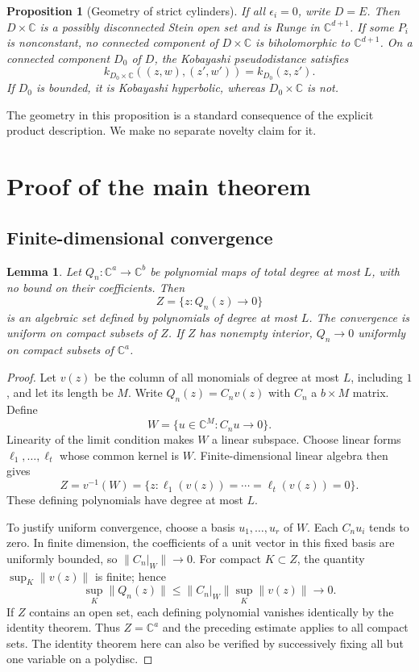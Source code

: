 \documentclass[12pt]{amsart}
\newtheorem{prop}[thm]{Proposition}
\newtheorem{lem}[thm]{Lemma}
\theoremstyle{definition}
\theoremstyle{remark}
\numberwithin{equation}{section}
\newcommand{\C}{\mathbb{C}}
\begin{document}
\begin{prop}[Geometry of strict cylinders]\label{prop:geometry-en}
If all $\epsilon_i=0$, write $D=E$. Then $D\times\C$ is a possibly disconnected Stein open set and is Runge in $\C^{d+1}$. If some $P_i$ is nonconstant, no connected component of $D\times\C$ is biholomorphic to $\C^{d+1}$. On a connected component $D_0$ of $D$, the Kobayashi pseudodistance satisfies
\begin{equation}\label{eq:kobayashi-en}
k_{D_0\times\C}((z,w),(z',w'))=k_{D_0}(z,z').
\end{equation}
If $D_0$ is bounded, it is Kobayashi hyperbolic, whereas $D_0\times\C$ is not.
\end{prop}
The geometry in this proposition is a standard consequence of the explicit product description. We make no separate novelty claim for it.

\section{Proof of the main theorem}
\subsection{Finite-dimensional convergence}
\begin{lem}\label{lem:finite-en}
Let $Q_n:\C^a\to\C^b$ be polynomial maps of total degree at most $L$, with no bound on their coefficients. Then
\[
Z=\{z:Q_n(z)\to0\}
\]
is an algebraic set defined by polynomials of degree at most $L$. The convergence is uniform on compact subsets of $Z$. If $Z$ has nonempty interior, $Q_n\to0$ uniformly on compact subsets of $\C^a$.
\end{lem}
\begin{proof}
Let $v(z)$ be the column of all monomials of degree at most $L$, including $1$, and let its length be $M$. Write $Q_n(z)=C_n v(z)$ with $C_n$ a $b\times M$ matrix. Define
\[
W=\{u\in\C^M:C_nu\to0\}.
\]
Linearity of the limit condition makes $W$ a linear subspace. Choose linear forms $\ell_1,\ldots,\ell_t$ whose common kernel is $W$. Finite-dimensional linear algebra then gives
\[
Z=v^{-1}(W)=\{z:\ell_1(v(z))=\cdots=\ell_t(v(z))=0\}.
\]
These defining polynomials have degree at most $L$.

To justify uniform convergence, choose a basis $u_1,\ldots,u_r$ of $W$. Each $C_nu_i$ tends to zero. In finite dimension, the coefficients of a unit vector in this fixed basis are uniformly bounded, so $\|C_n|_W\|\to0$. For compact $K\subset Z$, the quantity $\sup_K\|v(z)\|$ is finite; hence
\[
\sup_K\|Q_n(z)\|\leq\|C_n|_W\|\sup_K\|v(z)\|\longrightarrow0.
\]
If $Z$ contains an open set, each defining polynomial vanishes identically by the identity theorem. Thus $Z=\C^a$ and the preceding estimate applies to all compact sets. The identity theorem here can also be verified by successively fixing all but one variable on a polydisc.
\end{proof}
\end{document}

